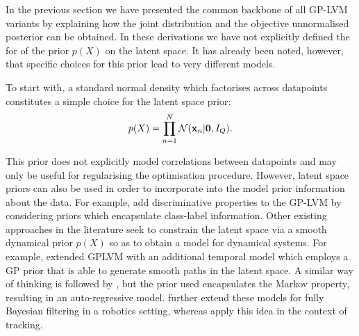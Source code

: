 In the previous section we have presented the common backbone of all GP-LVM variants by
explaining how the joint distribution and the objective unnormalised posterior can be
obtained. In these derivations we have not explicitly defined the for of the prior $p(X)$ on
the latent space. It has already been noted, however, that specific choices for this
prior lead to very different models.

To start with, a standard normal density which factorises across datapoints
constitutes a simple choice for the latent space prior: 
\begin{equation}
\label{standardNormal}
p(X) = \prod_{n=1}^N \mathcal{N}(\mathbf{x}_n | \mathbf{0}, I_Q) .
\end{equation}

\noindent This prior does not explicitly model correlations between datapoints and
may only be useful for regularising the optimisation procedure. However,
latent space priors can also be used in order to 
incorporate into the model prior information about the data. 
For example, \cite{Urtasun:dgplvm07} add discriminative properties to the GP-LVM by
considering priors which encapsulate class-label information.
Other existing approaches in the literature seek to constrain the latent space via a
smooth dynamical prior $p(X)$ so as to obtain a model for dynamical systems.
For example, \cite{hgplvm} extended GPLVM
with an additional temporal model which employs a GP prior that is able to generate smooth
paths in the latent space.
A similar way of thinking is followed by \cite{GPDM,Wang:gpdm08}, but the prior used
encapsulates the Markov property, resulting in an auto-regressive model. 
\cite{GP-Based,GP-Based2} further extend these models for fully Bayesian filtering
in a robotics setting, whereas \cite{Urtasun:3dpeople06} apply this idea in the context of tracking.

